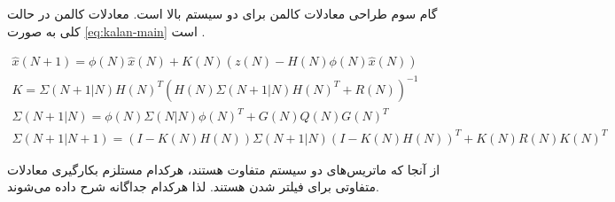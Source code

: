 گام سوم طراحی معادلات کالمن برای دو سیستم بالا است. معادلات کالمن در حالت کلی به صورت \ref{eq:kalan-main} است \cite{uncertain}.

\begin{gather}
	\hat{x}(N+1) = \phi(N)\hat{x}(N) + K(N)(z(N)-H(N)\phi(N)\hat{x}(N)) \nonumber \\
	K = \Sigma(N+1|N)H(N)^T(H(N)\Sigma(N+1|N)H(N)^T+R(N))^{-1} \nonumber \\
	\Sigma(N+1|N) = \phi(N)\Sigma(N|N)\phi(N)^T + G(N)Q(N)G(N)^T \nonumber \\
	\Sigma(N+1|N+1) = (I-K(N)H(N))\Sigma(N+1|N)(I-K(N)H(N))^T+K(N)R(N)K(N)^T \label{eq:kalan-main}
\end{gather}

از آنجا که ماتریس‌های دو سیستم متفاوت هستند، هرکدام مستلزم بکارگیری معادلات متفاوتی برای فیلتر شدن هستند. لذا هرکدام جداگانه شرح داده می‌شوند.
